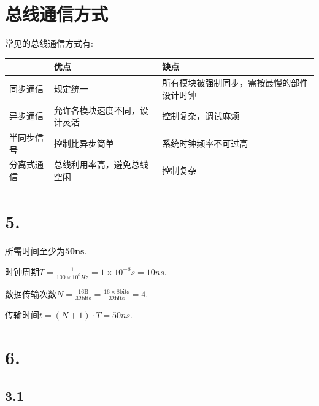 \documentclass[11pt]{article}  %
\begin{document}
\section{总线通信方式}
常见的总线通信方式有: 

\begin{table}[H]
    \begin{tabular}{|l|l|l|}
        \hline
            & 优点             & 缺点                    \\ \hline
        同步通信  & 规定统一           & 所有模块被强制同步，需按最慢的部件设计时钟 \\ \hline
        异步通信  & 允许各模块速度不同，设计灵活 & 控制复杂，调试麻烦             \\ \hline
        半同步信号 & 控制比异步简单        & 系统时钟频率不可过高            \\ \hline
        分离式通信 & 总线利用率高，避免总线空闲  & 控制复杂                  \\ \hline
    \end{tabular}
\end{table}

\section*{5.}
所需时间至少为\textbf{50ns}.

时钟周期$\displaystyle T=\frac{1}{100\times 10^6Hz} = 1\times 10^{-8}s = 10ns$.

数据传输次数$\displaystyle N = \frac{16 \text{B}}{32 \text{bits}}=\frac{16\times 8 \text{bits}}{32 \text{bits}} = 4$.

传输时间$t = (N+1)\cdot T = 50ns$.

\section*{6.}

\subsection*{3.1}
\end{document}
